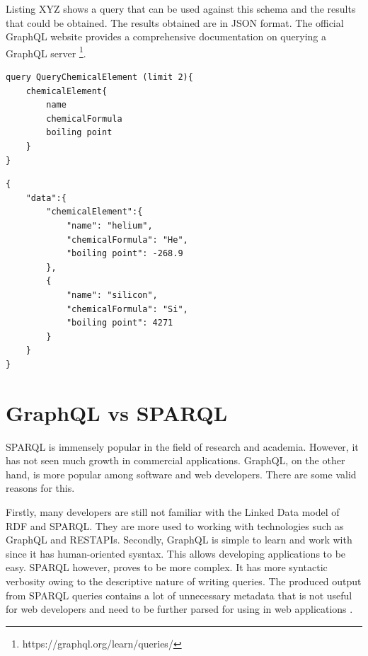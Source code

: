 Listing XYZ shows a query that can be used against this schema and the results that could be obtained. The results obtained are in JSON format. The official GraphQL website provides a comprehensive documentation on querying a GraphQL server \footnote{ https://graphql.org/learn/queries/}. 

\begin{minipage}{\linewidth}
\begin{lstlisting}[label=listing:listing5, caption={Query to fetch chemical elements and their properties}]
query QueryChemicalElement (limit 2){
    chemicalElement{
		name
		chemicalFormula
		boiling point
	}
}
\end{lstlisting}
\end{minipage}

\begin{minipage}{\linewidth}
\begin{lstlisting}[label=listing:listing5, caption={Query to fetch chemical elements and their properties}]
{
	"data":{
		"chemicalElement":{
			"name": "helium",
			"chemicalFormula": "He",
			"boiling point": -268.9
		},
		{	
			"name": "silicon",
			"chemicalFormula": "Si",
			"boiling point": 4271
		}
	}
}

\end{lstlisting}
\end{minipage}

\section{GraphQL vs SPARQL}

SPARQL is immensely popular in the field of research and academia. However, it has not seen much growth in commercial applications. GraphQL, on the other hand, is more popular among software and web developers. There are some valid reasons for this.  

Firstly, many developers are still not familiar with the Linked Data model of RDF and SPARQL. They are more used to working with technologies such as GraphQL and RESTAPIs. Secondly, GraphQL is simple to learn and work with since it has human-oriented sysntax. This allows developing applications to be easy. SPARQL however, proves to be more complex. It has more syntactic verbosity owing to the descriptive nature of writing queries. The produced output from SPARQL queries contains a lot of unnecessary metadata that is not useful for web developers and need to be further parsed for using in web applications \cite{Lisena2018}. 


